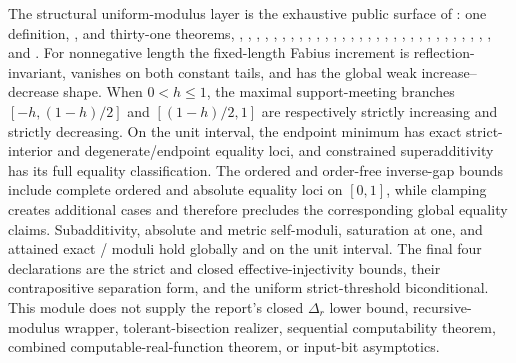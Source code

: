 \documentclass[11pt,oneside]{article}
\theoremstyle{definition}
\theoremstyle{remark}
\begin{document}
The structural uniform-modulus layer is the exhaustive public surface of
: one definition,
, and thirty-one theorems,
,
,
,
,
,
,
,
,
,
,
,
,
,
,
,
,
,
,
,
,
,
,
,
,
,
,
,
,
,
, and
.
For nonnegative length the fixed-length Fabius increment is reflection-invariant,
vanishes on both constant tails, and has the global weak increase--decrease shape.  When
\(0<h\leq1\), the maximal support-meeting branches \([-h,(1-h)/2]\) and
\([(1-h)/2,1]\) are respectively strictly increasing and strictly decreasing.  On the
unit interval, the endpoint minimum has exact strict-interior and degenerate/endpoint
equality loci, and constrained superadditivity has its full equality classification.  The
ordered and order-free inverse-gap bounds include complete ordered and absolute equality
loci on \([0,1]\), while clamping creates additional cases and therefore precludes the
corresponding global equality claims.  Subadditivity, absolute and metric self-moduli,
saturation at one, and attained exact / moduli hold globally
and on the unit interval.  The final four declarations are the strict and closed
effective-injectivity bounds, their contrapositive separation form, and the uniform
strict-threshold biconditional.  This module does not supply the report's closed
\(\Delta_r\) lower bound, recursive-modulus wrapper, tolerant-bisection realizer,
sequential computability theorem, combined computable-real-function theorem, or input-bit
asymptotics.
\end{document}

